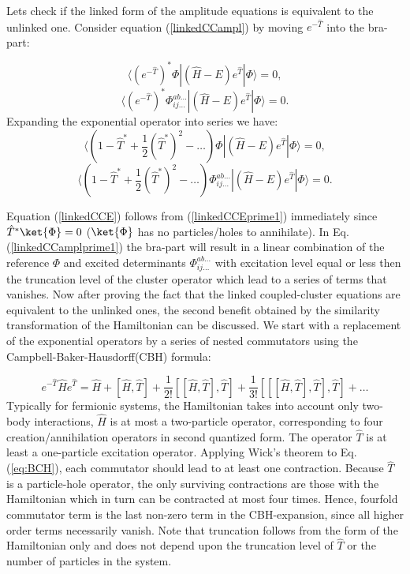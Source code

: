 \documentclass[twoside,english]{uiofysmaster}
\begin{document}
Lets check if the linked form of the amplitude equations is equivalent
to the unlinked one. Consider equation (\ref{linkedCCampl}) by moving
$e^{-\hat{T}}$ into the bra-part:

\begin{equation}\label{linkedCCEprime}
\langle(e^{-\hat{T}})^*\Phi|(\hat{H}-E)e^{\hat{T}}|\Phi\rangle = 0,
\end{equation}
\begin{equation}\label{linkedCCamplprime}
\langle(e^{-\hat{T}})^*\Phi_{ij\dots}^{ab\dots}|(\hat{H}-E)e^{\hat{T}}|\Phi\rangle = 0.
\end{equation}
Expanding the exponential operator into series we have:
\begin{equation}\label{linkedCCEprime1}
\langle(1 - \hat{T}^* + \frac{1}{2}(\hat{T}^*)^2 - \dots)\Phi|(\hat{H}-E)e^{\hat{T}}|\Phi\rangle = 0,
\end{equation}
\begin{equation}\label{linkedCCamplprime1}
\langle(1 - \hat{T}^* + \frac{1}{2}(\hat{T}^*)^2- \dots)\Phi_{ij\dots}^{ab\dots}|(\hat{H}-E)e^{\hat{T}}|\Phi\rangle = 0.
\end{equation}

Equation (\ref{linkedCCE}) follows from (\ref{linkedCCEprime1})
immediately since $\hat{T}^*\ket{\Phi}=0$ ($\ket{\Phi}$ has no
particles/holes to annihilate).  In Eq. (\ref{linkedCCamplprime1}) the
bra-part will result in a linear combination of the reference $\Phi$
and excited determinants $\Phi_{ij\dots}^{ab\dots}$ with excitation
level equal or less then the truncation level of the cluster operator
which lead to a series of terms that vanishes.  Now after proving the
fact that the linked coupled-cluster equations are equivalent to the
unlinked ones, the second benefit obtained by the similarity
transformation of the Hamiltonian can be discussed. We start with a
replacement of the exponential operators by a series of nested
commutators using the Campbell-Baker-Hausdorff(CBH) formula:

\begin{equation}\label{eq:BCH}
e^{-\hat{T}}\hat{H}e^{\hat{T}} = \hat{H} + [\hat{H},\hat{T}] + \frac{1}{2!}[[\hat{H},\hat{T}],\hat{T}] + \frac{1}{3!}[[[\hat{H},\hat{T}],\hat{T}],\hat{T}] + \dots
\end{equation}
Typically for fermionic systems, the Hamiltonian takes into account
only two-body interactions, $\hat{H}$ is at most a two-particle
operator, corresponding to four creation/annihilation operators in
second quantized form. The operator $\hat{T}$ is at least a
one-particle excitation operator.  Applying Wick's theorem to
Eq. (\ref{eq:BCH}), each commutator should lead to at least one
contraction. Because $\hat{T}$ is a particle-hole operator, the only
surviving contractions are those with the Hamiltonian which in turn
can be contracted at most four times. Hence, fourfold commutator term
is the last non-zero term in the CBH-expansion, since all higher order
terms necessarily vanish.  Note that truncation follows from the form
of the Hamiltonian only and does not depend upon the truncation level
of $\hat{T}$ or the number of particles in the system.
\end{document}
